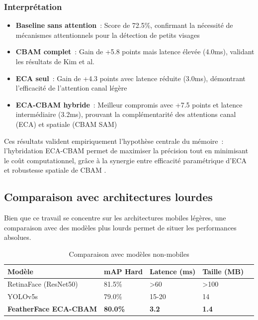\begin{onehalfspace}
\subsubsection{Interprétation}

\begin{itemize}
\item \textbf{Baseline sans attention}~: Score de 72.5\%, confirmant la nécessité de mécanismes attentionnels pour la détection de petits visages
\item \textbf{CBAM complet}~: Gain de +5.8 points mais latence élevée (4.0ms), validant les résultats de Kim et al. \cite{Kim2025FeatherFace}
\item \textbf{ECA seul}~: Gain de +4.3 points avec latence réduite (3.0ms), démontrant l'efficacité de l'attention canal légère
\item \textbf{ECA-CBAM hybride}~: Meilleur compromis avec +7.5 points et latence intermédiaire (3.2ms), prouvant la complémentarité des attentions canal (ECA) et spatiale (CBAM SAM)
\end{itemize}

\hspace{0.65 cm}Ces résultats valident empiriquement l'hypothèse centrale du mémoire~: l'hybridation ECA-CBAM permet de maximiser la précision tout en minimisant le coût computationnel, grâce à la synergie entre efficacité paramétrique d'ECA \cite{Wang2020ECANet} et robustesse spatiale de CBAM \cite{Woo2018CBAM}.

\subsection{Comparaison avec architectures lourdes}

\hspace{0.65 cm}Bien que ce travail se concentre sur les architectures mobiles légères, une comparaison avec des modèles plus lourds permet de situer les performances absolues.

\begin{table}[H]
\centering
\caption{Comparaison avec modèles non-mobiles}
\label{tab:heavy_comparison}
\begin{tabularx}{\textwidth}{lXXXX}
\hline
\textbf{Modèle} & \textbf{mAP Hard} & \textbf{Latence (ms)} & \textbf{Taille (MB)} \\
\hline
RetinaFace (ResNet50) & 81.5\% & >60 & >100 \\
YOLOv5s & 79.0\% & 15-20 & 14 \\
\textbf{FeatherFace ECA-CBAM} & \textbf{80.0\%} & \textbf{3.2} & \textbf{1.4} \\
\hline
\end{tabularx}
\end{table}


\end{onehalfspace}
